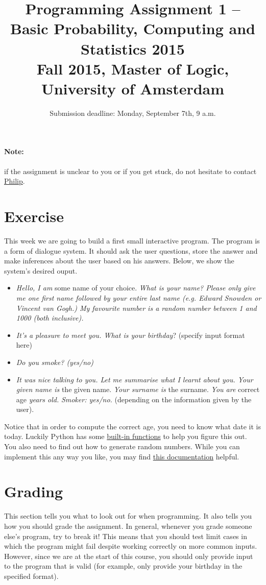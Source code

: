 \documentclass[11pt, leqno, a4paper]{article}
\title{Programming Assignment 1 -- Basic Probability, Computing and Statistics 2015 \\[2mm]
\large{Fall 2015, Master of Logic, University of Amsterdam}}
\author{}
\date{Submission deadline: Monday, September 7th, 9 a.m.}
\begin{document}
\maketitle

\paragraph{Note:} if the assignment is unclear to you or if you get stuck, do not hesitate to contact \href{mailto:P.Schulz@uva.nl}{Philip}.

\section{Exercise}
This week we are going to build a first small interactive program. The program is a form of dialogue system. It should ask the user questions,
store the answer and make inferences about the user based on his answers. Below, we show the system's desired ouput. 
\begin{itemize}
\item \textit{Hello, I am} some name of your choice. \textit{What is
    your name? Please only give me one first name followed by your
    entire last name (e.g. \emph{Edward Snowden} or \emph{Vincent van Gogh}.) My favourite number
    is \emph{a random number between 1 and 1000 (both inclusive)}.}
\item \textit{It's a pleasure to meet you. What is your birthday}? (specify input format here)
\item \textit{Do you smoke? (yes/no)}
\item \textit{It was nice talking to you. Let me summarise what I learnt about you. Your given name is} the given name. \textit{Your surname is}
the surname. \textit{You are} correct age \textit{years old.} 
\textit{Smoker: yes/no.} (depending on the information given by the user).
\end{itemize}

Notice that in order to compute the correct age, you need to know what date it is today. Luckily
Python has some \href{https://docs.python.org/2/library/datetime.html}{built-in functions} to help
you figure this out. You also need to find out how to generate random numbers. While you can implement
this any way you like, you may find \href{https://docs.python.org/2/library/random.html}{this documentation} helpful.

\section{Grading}
This section tells you what to look out for when programming. It also tells you how you should grade the assignment. In general, whenever you grade 
someone else's program, try to break it! This means that you should test limit cases in which the program might fail despite working correctly
on more common inputs. However, since we are at the start of this course, you should only provide input
to the program that is valid (for example, only provide your birthday in the specified format).
\end{document}
